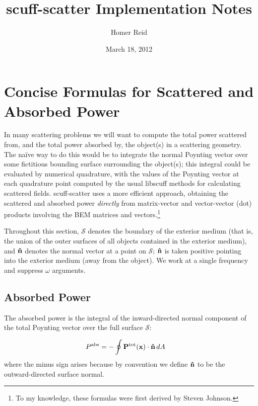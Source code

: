 \documentclass[letterpaper]{article}
\title {{\sc scuff-scatter} Implementation Notes}
\author {Homer Reid}
\date {March 18, 2012}
\begin{document}
\pagestyle{myheadings}
\maketitle

\tableofcontents

\newpage
\section{Concise Formulas for Scattered and Absorbed Power}

In many scattering problems we will want to compute the total
power scattered from, and the total power absorbed by, the
object(s) in a scattering geometry.  The na\"ive way to do 
this would be to integrate the normal Poynting vector over
some fictitious bounding surface surrounding the object(s);
this integral could be evaluated by numerical quadrature,
with the values of the Poynting vector at each quadrature
point computed by the usual {\sc libscuff} methods for
calculating scattered fields. {\sc scuff-scatter} uses a 
more efficient approach, obtaining the scattered and absorbed 
power \textit{directly} from matrix-vector and vector-vector 
(dot) products involving the BEM matrices and 
vectors.\footnote{To my knowledge, these formulas were first
derived by Steven Johnson.}

Throughout this section, $\mathcal{S}$ denotes the boundary
of the exterior medium (that is, the union of the outer surfaces
of all objects contained in the exterior medium), and 
$\mathbf{\hat n}$ denotes the normal vector at a point on 
$\mathcal{S}$; $\mathbf{\hat n}$ is taken positive pointing
into the exterior medium (away from the object).
We work at a single frequency and suppress $\omega$ arguments.

\subsection{Absorbed Power}

The absorbed power is the integral of the inward-directed normal 
component of the total Poynting vector over the full surface
$\mathcal{S}$:

\begin{align}
 P^{\hbox{\scriptsize{abs}}} 
&= - \oint \mathbf{P}^{\hbox{\scriptsize{tot}}}(\mathbf{x}) \cdot \mathbf{\hat n} \, dA 
\label{AbsorbedPower}
\end{align}
where the minus sign arises because by convention we define $\mathbf{\hat n}$ 
to be the outward-directed surface normal.
\end{document}
